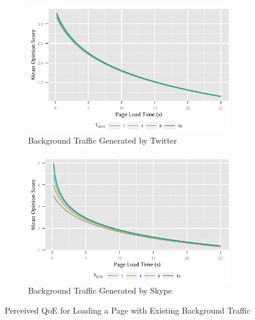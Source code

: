 \begin{figure}
	\begin{subfigure}[b]{\textwidth}
	\centering
	\includegraphics{network/network_traces/numerical_results/figures/qoe_with_backgroundapp_twitter}
	\caption{Background Traffic Generated by Twitter}\label{fig:network:network_traces:numerical_results:web_qoe:twitter}
	\end{subfigure} 

	\begin{subfigure}[b]{\textwidth}
	\centering
	\includegraphics{network/network_traces/numerical_results/figures/qoe_with_backgroundapp_skype}
	\caption{Background Traffic Generated by Skype}\label{fig:network:network_traces:numerical_results:web_qoe:skype}
	\end{subfigure}

	\caption{Perceived \gls{QoE} for Loading a Page with Existing Background Traffic}\label{fig:network:network_traces:numerical_results:web_qoe}
\end{figure}

